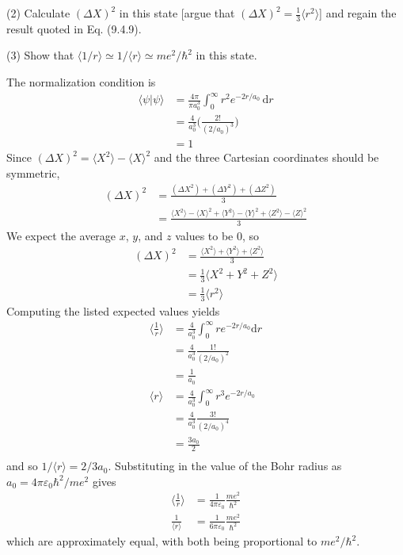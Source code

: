 \documentclass[../principles-of-quantum-mechanics.tex]{subfiles}
\begin{document}
\begin{questions}
		(2) Calculate $(\Delta X)^2$ in this state [argue that $(\Delta X)^2 = \tfrac{1}{3}\langle r^2\rangle$] and regain the result quoted in Eq. (9.4.9).
		
		(3) Show that $\langle 1/r\rangle \simeq 1 / \langle r\rangle \simeq m e^2/\hbar^2$ in this state.
		\begin{solution}
			The normalization condition is
			\begin{align*}
				\langle \psi|\psi\rangle &= \frac{4\pi}{\pi a_0^3}\int_0^\infty r^2e^{-2r/a_0}\,\mathrm{d}r \\
				&= \frac{4}{a_0^3}\Big(\frac{2!}{(2/a_0)^3}\Big) \\
				&= 1
			\end{align*}
			Since $(\Delta X)^2 = \langle X^2\rangle - \langle X\rangle^2$ and the three Cartesian coordinates should be symmetric, 
			\begin{align*}
				(\Delta X)^2 &= \frac{(\Delta X^2) + (\Delta Y^2) + (\Delta Z^2)}{3} \\
				&= \frac{\langle X^2\rangle - \langle X\rangle^2 + \langle Y^2\rangle - \langle Y\rangle^2 + \langle Z^2\rangle - \langle Z\rangle^2}{3}
			\end{align*}
			We expect the average $x$, $y$, and $z$ values to be $0$, so 
			\begin{align*}
				(\Delta X)^2 &= \frac{\langle X^2\rangle + \langle Y^2\rangle + \langle Z^2\rangle}{3} \\
				&= \frac{1}{3}\langle X^2 + Y^2 + Z^2\rangle \\
				&= \frac{1}{3}\langle r^2\rangle
			\end{align*}
			Computing the listed expected values yields
			\begin{align*}
				\Big\langle\frac{1}{r}\Big\rangle &= \frac{4}{a_0^3}\int_0^\infty re^{-2r/a_0}\mathrm{d}r \\
				&= \frac{4}{a_0^3}\frac{1!}{(2/a_0)^2} \\
				&= \frac{1}{a_0} \\
				\langle r\rangle &= \frac{4}{a_0^3}\int_0^{\infty}r^3e^{-2r/a_0} \\
				&= \frac{4}{a_0^3}\frac{3!}{(2/a_0)^4} \\
				&= \frac{3a_0}{2} \\
			\end{align*}
			and so $1/\langle r\rangle = 2/3a_0$. Substituting in the value of the Bohr radius as $a_0 = 4\pi\varepsilon_0\hbar^2/m e^2$ gives
			\begin{align*}
				\Big\langle\frac{1}{r}\Big\rangle &= \frac{1}{4\pi\varepsilon_0}\frac{m e^2}{\hbar^2} \\
				\frac{1}{\langle r\rangle} &= \frac{1}{6\pi\varepsilon_0}\frac{me^2}{\hbar^2}
			\end{align*}
			which are approximately equal, with both being proportional to $me^2/\hbar^2$.
		\end{solution}
		

\end{questions}
\end{document}
